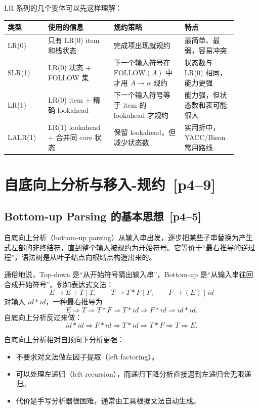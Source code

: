 \documentclass[UTF8,fontset=none,11pt]{ctexart}
\newenvironment{defbox}[1][]{%
  \par\medskip\noindent{\color{defrule}\rule{\linewidth}{1.1pt}}\par\nopagebreak
  \noindent{\bfseries\color{defrule}#1}\par\nopagebreak\smallskip}%
  {\par\nopagebreak\smallskip\noindent{\color{defrule}\rule{\linewidth}{0.4pt}}\par\medskip}
\newcommand{\pg}[1]{\texorpdfstring{{\small\color{graytext}\,[p#1]}}{ [p#1]}}
\newcommand{\FOLLOW}{\ensuremath{\mathrm{FOLLOW}}}
\begin{document}
LR 系列的几个变体可以先这样理解：

\begin{longtable}{L{0.16\linewidth}L{0.26\linewidth}L{0.28\linewidth}L{0.20\linewidth}}
\toprule
类型 & 使用的信息 & 规约策略 & 特点 \\
\midrule
LR(0) & 只有 LR(0) item 和栈状态 & 完成项出现就规约 & 最简单、最弱，容易冲突 \\
SLR(1) & LR(0) 状态 + FOLLOW 集 & 下一个输入符号在 \(\FOLLOW(A)\) 中才用 \(A\to\alpha\) 规约 & 状态数与 LR(0) 相同，能力更强 \\
LR(1) & LR(0) item + 精确 lookahead & 下一个输入符号等于 item 的 lookahead 才规约 & 能力强，但状态数和表可能很大 \\
LALR(1) & LR(1) lookahead + 合并同 core 状态 & 保留 lookahead，但减少状态数 & 实用折中，YACC/Bison 常用路线 \\
\bottomrule
\end{longtable}

\section{自底向上分析与移入-规约 \pg{4--9}}

\subsection{Bottom-up Parsing 的基本思想 \pg{4--5}}

\begin{defbox}[定义：自底向上分析]
自底向上分析（bottom-up parsing）从输入串出发，逐步把某些子串替换为产生式左部的非终结符，直到整个输入被规约为开始符号。它等价于“最右推导的逆过程”，语法树是从叶子结点向根结点构造出来的。
\end{defbox}

通俗地说，Top-down 是“从开始符号猜出输入串”，Bottom-up 是“从输入串往回合成开始符号”。例如表达式文法：
\[
E\to E+T\mid T,\qquad T\to T*F\mid F,\qquad F\to (E)\mid id
\]
对输入 \(id*id\)，一种最右推导为
\[
E \Rightarrow T \Rightarrow T*F \Rightarrow T*id \Rightarrow F*id \Rightarrow id*id.
\]
自底向上分析反过来做：
\[
id*id \Rightarrow F*id \Rightarrow T*id \Rightarrow T*F \Rightarrow T \Rightarrow E.
\]

自底向上分析相对自顶向下分析更强：

\begin{itemize}
  \item 不要求对文法做左因子提取（left factoring）。
  \item 可以处理左递归（left recursion），而递归下降分析直接遇到左递归会无限递归。
  \item 代价是手写分析器很困难，通常由工具根据文法自动生成。
\end{itemize}
\end{document}
